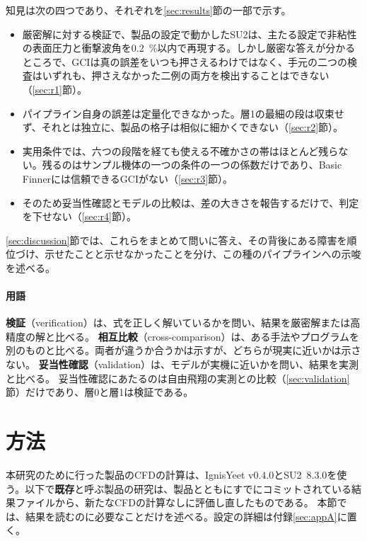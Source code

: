 \documentclass[twocolumn]{labreport}
\begin{document}
知見は次の四つであり、それぞれを\ref{sec:results}節の一部で示す。
\begin{itemize}
\item 厳密解に対する検証で、製品の設定で動かしたSU2は、主たる設定で非粘性の表面圧力と衝撃波角を0.2~\%以内で再現する。しかし厳密な答えが分かるところで、GCIは真の誤差をいつも押さえるわけではなく、手元の二つの検査はいずれも、押さえなかった二例の両方を検出することはできない（\ref{sec:r1}節）。
\item パイプライン自身の誤差は定量化できなかった。層1の最細の段は収束せず、それとは独立に、製品の格子は相似に細かくできない（\ref{sec:r2}節）。
\item 実用条件では、六つの段階を経ても使える不確かさの帯はほとんど残らない。残るのはサンプル機体の一つの条件の一つの係数だけであり、Basic Finnerには信頼できるGCIがない（\ref{sec:r3}節）。
\item そのため妥当性確認とモデルの比較は、差の大きさを報告するだけで、判定を下せない（\ref{sec:r4}節）。
\end{itemize}
\ref{sec:discussion}節では、これらをまとめて問いに答え、その背後にある障害を順位づけ、示せたことと示せなかったことを分け、この種のパイプラインへの示唆を述べる。

\paragraph{用語}
\textbf{検証}（verification）は、式を正しく解いているかを問い、結果を厳密解または高精度の解と比べる。
\textbf{相互比較}（cross-comparison）は、ある手法やプログラムを別のものと比べる。両者が違うか合うかは示すが、どちらが現実に近いかは示さない。
\textbf{妥当性確認}（validation）は、モデルが実機に近いかを問い、結果を実測と比べる。
妥当性確認にあたるのは自由飛翔の実測との比較（\ref{sec:validation}節）だけであり、層0と層1は検証である。

\section{方法}
\label{sec:method}

本研究のために行った製品のCFDの計算は、IgnisYeet v0.4.0とSU2~8.3.0を使う。以下で\textbf{既存}と呼ぶ製品の研究は、製品とともにすでにコミットされている結果ファイルから、新たなCFDの計算なしに評価し直したものである。
本節では、結果を読むのに必要なことだけを述べる。設定の詳細は付録\ref{sec:appA}に置く。
\end{document}
